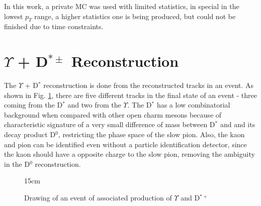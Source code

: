 In this work, a private MC was used with limited statistics, in special in the lowest $p_T$ range, a higher statistics one is being produced, but could not be finished due to time constraints.

\section{\texorpdfstring{$\Upsilon$ + D$^{*\pm}$}{Y+D*} Reconstruction}

The $\Upsilon$ + D$^*$ reconstruction is done from the reconstructed tracks in an event. As shown in Fig. \ref{fig:drawing_event}, there are five different tracks in the final state of an event - three coming from the D$^*$ and two from the $\Upsilon$. The D$^*$ has a low combinatorial background when compared with other open charm mesons because of characteristic signature of a very small difference of mass between D$^*$ and and its decay product D$^0$, restricting the phase space of the slow pion. Also, the kaon and pion can be identified even without a particle identification detector, since the kaon should have a opposite charge to the slow pion, removing the ambiguity in the D$^0$ reconstruction.

\begin{figure}[!htm]{15cm}
  \caption{Drawing of an event of associated production of $\Upsilon$ and D$^{*+}$}%
  \label{fig:drawing_event}
\end{figure}

